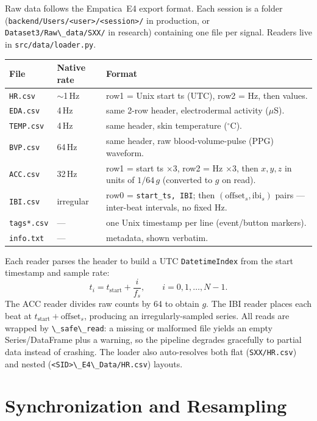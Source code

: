 \documentclass[11pt,a4paper]{article}
\newcommand{\code}[1]{\lstinline[basicstyle=\ttfamily\normalsize]!#1!}
\begin{document}
Raw data follows the Empatica~E4 export format. Each session is a folder
(\code{backend/Users/<user>/<session>/} in production, or
\code{Dataset3/Raw\_data/SXX/} in research) containing one file per signal.
Readers live in \code{src/data/loader.py}.

\begin{longtable}{@{}llp{}@{}}
\toprule
\textbf{File} & \textbf{Native rate} & \textbf{Format} \\
\midrule
\endhead
\code{HR.csv} & $\sim$1\,Hz & row1 = Unix start ts (UTC), row2 = Hz, then values. \\
\code{EDA.csv} & 4\,Hz & same 2-row header, electrodermal activity ($\mu$S). \\
\code{TEMP.csv} & 4\,Hz & same header, skin temperature ($^\circ$C). \\
\code{BVP.csv} & 64\,Hz & same header, raw blood-volume-pulse (PPG) waveform. \\
\code{ACC.csv} & 32\,Hz & row1 = start ts $\times3$, row2 = Hz $\times3$, then
$x,y,z$ in units of $1/64\,g$ (converted to $g$ on read). \\
\code{IBI.csv} & irregular & row0 = \texttt{start\_ts, IBI}; then
$(\text{offset}_s, \text{ibi}_s)$ pairs --- inter-beat intervals, no fixed Hz. \\
\code{tags*.csv} & --- & one Unix timestamp per line (event/button markers). \\
\code{info.txt} & --- & metadata, shown verbatim. \\
\bottomrule
\end{longtable}

Each reader parses the header to build a UTC \code{DatetimeIndex} from the start
timestamp and sample rate:
\[
t_i = t_{\text{start}} + \frac{i}{f_s},\qquad i = 0,1,\dots,N-1 .
\]
The ACC reader divides raw counts by 64 to obtain $g$. The IBI reader places
each beat at $t_{\text{start}}+\text{offset}_s$, producing an irregularly-sampled
series. All reads are wrapped by \code{\_safe\_read}: a missing or malformed file
yields an empty Series/DataFrame plus a warning, so the pipeline degrades
gracefully to partial data instead of crashing. The loader also auto-resolves
both flat (\code{SXX/HR.csv}) and nested (\code{<SID>\_E4\_Data/HR.csv}) layouts.

\section{Synchronization and Resampling}\label{sec:sync}
\end{document}
